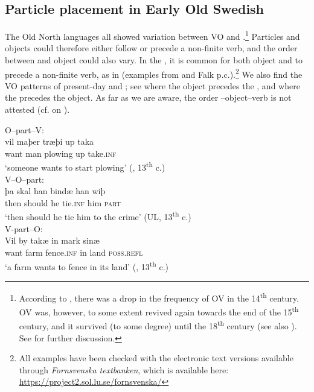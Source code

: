 \documentclass[output=paper]{langscibook}
\begin{document}
\subsection{Particle placement in Early Old Swedish}\label{sec:lalu:4.1}

The Old North  languages all showed variation between VO and .\footnote{According to \citet{Delsing1999}, there was a drop in the frequency of OV in the 14\textsuperscript{th} century. OV was, however, to some extent revived again towards the end of the 15\textsuperscript{th} century, and it survived (to some degree) until the 18\textsuperscript{th} century (see also \citealt{Petzell2011}). See  for further discussion.} Particles and objects could therefore either follow or precede a non-finite verb, and the order between  and object could also vary. In the  , it is common for both object and  to precede a non-finite verb, as in  (examples from \citealt{Ljunggren1932} and Falk p.c.).\footnote{All  examples have been checked with the electronic text versions available through \textit{Fornsvenska textbanken}, which is available here: \url{https://project2.sol.lu.se/fornsvenska/}}  We also find the VO patterns of present-day  and ; see  where the object precedes the , and  where the  precedes the object. As far as we are aware, the order –object–verb is not attested (cf. \citealt{Hroarsdottir2008} on ).


\ea\label{ex:lalu:21}
\ea\label{ex:lalu:21a} O–part–V:  \\
\gll  vil     maþer   træþi       up   taka \\
    want     man     plowing    up   take\textsc{.inf} \\
\glt `someone wants to start plowing’ (, 13\textsuperscript{th} c.)\\

\ex\label{ex:lalu:21b} V–O–part:     \\
\gll  þa     skal     han   bindæ   han   wiþ \\
    then   should   he   tie\textsc{.inf}   him   \textsc{part} \\
\glt `then should he tie him to the crime’ (UL, 13\textsuperscript{th} c.)\\

\ex\label{ex:lalu:21c}  V-part–O:     \\
\gll  Vil     by   takæ       in   mark   sinæ \\
    want  farm   fence.\textsc{inf}   in   land   \textsc{poss.refl} \\
\glt `a farm wants to fence in its land’ (, 13\textsuperscript{th} c.)\\
\z
\z
\end{document}
